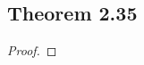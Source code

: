 \documentclass[../../main.tex]{subfiles}
\begin{document}
\subsection{Theorem 2.35}
\begin{wts}

\end{wts}
\begin{proof}

\end{proof}
\end{document}
